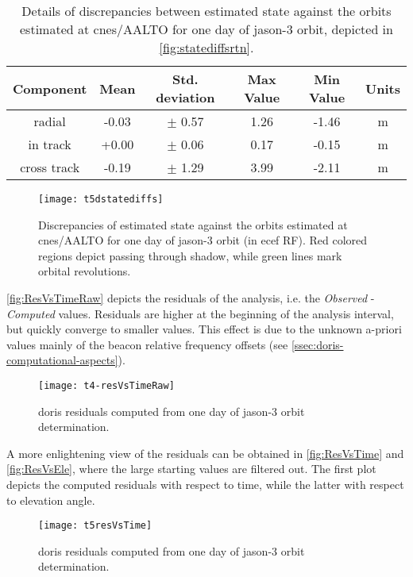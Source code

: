 \begin{table}[h!]
    \centering
    \begin{tabularx}{\textwidth}{cccccc}
        \toprule
        \textbf{Component} & \textbf{Mean} & \textbf{Std. deviation} & \textbf{Max Value} & \textbf{Min Value} & \textbf{Units}\\
        \hline
        radial &  -0.03 & $\pm$ 0.57 & 1.26 & -1.46 & \si{\metre}\\
        in track &  +0.00 & $\pm$ 0.06 & 0.17 & -0.15 & \si{\metre}\\
        cross track &  -0.19 & $\pm$ 1.29 & 3.99 & -2.11 & \si{\metre}\\
       \bottomrule
    \end{tabularx}
    \caption{Details of discrepancies between estimated state against the orbits estimated at \gls{cnes}/AALTO for one day of \gls{jason}-3 orbit, depicted in \autoref{fig:statediffsrtn}.}
    \label{table:statediffsrtn}
\end{table}

\begin{figure}
    \centering
    \texttt{[image: t5dstatediffs]}
    \caption{Discrepancies of estimated state against the orbits estimated at \gls{cnes}/AALTO for one day of \gls{jason}-3 orbit (in \gls{ecef} RF). Red colored regions depict passing through shadow, while green lines mark orbital revolutions.}
    \label{fig:statediffs-details}
\end{figure}

\autoref{fig:ResVsTimeRaw} depicts the residuals of the analysis, i.e. the \emph{Observed} 
- \emph{Computed} values. Residuals are higher at the beginning of the analysis interval, but 
quickly converge to smaller values. This effect is due to the unknown a-priori values mainly of 
the beacon relative frequency offsets (see \autoref{ssec:doris-computational-aspects}). 
\begin{figure}
    \centering
    \texttt{[image: t4-resVsTimeRaw]}
    \caption{\gls{doris} residuals computed from one day of \gls{jason}-3 orbit determination.}
    \label{fig:ResVsTimeRaw}
\end{figure}

A more enlightening view of the residuals can be obtained in \autoref{fig:ResVsTime} and 
\autoref{fig:ResVsEle}, where the large starting values are filtered out. The first 
plot depicts the computed residuals with respect to time, while the latter with respect to 
elevation angle. 
\begin{figure}
    \centering
    \texttt{[image: t5resVsTime]}
    \caption{\gls{doris} residuals computed from one day of \gls{jason}-3 orbit determination.}
    \label{fig:ResVsTime}
\end{figure}

